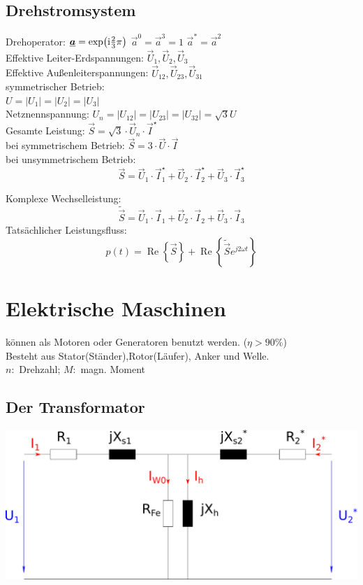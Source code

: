 \documentclass[fs, footer]{latex4ei}
\begin{document}
\begin{multicols}{4}
\begin{tabular}{ll}
		\end{tabular}



		\subsection{Drehstromsystem}
		Drehoperator: $\underline{\boldsymbol {a}} = \exp\bigl(\mathrm{i} \frac{2}{3} \pi \bigr)$ \qquad $\vec a^0 = \vec a^3 = 1$ \quad $\vec a^* = \vec a^2$\\
		
		
		Effektive Leiter-Erdspannungen: $\vec U_1,\vec U_2,\vec U_3$\\
		Effektive Außenleiterspannungen: $\vec U_{12},\vec U_{23},\vec U_{31}$\\
		symmetrischer Betrieb:\\
		$U = |U_1| = |U_2| = |U_3|$\\
		Netznennspannung: $U_n = |U_{12}| = |U_{23}| = |U_{32}| = \sqrt{3} U$\\
		Gesamte Leistung: $\vec S = \sqrt{3} \cdot \vec U_n \cdot \vec I^\star$\\
		bei symmetrischem Betrieb: $\vec S = 3 \cdot \vec U \cdot \vec I$\\
		bei unsymmetrischem Betrieb: 
		\[\vec S = \vec U_1 \cdot \vec I_1^\star + \vec U_2 \cdot \vec I_2^\star + \vec U_3 \cdot \vec I_3^\star\]
		
		Komplexe Wechselleistung:
		\[\tilde{\vec S} = \vec U_1 \cdot \vec I_1 + \vec U_2 \cdot \vec I_2 + \vec U_3 \cdot \vec I_3\]
		Tatsächlicher Leistungsfluss:
		\[p(t) = \operatorname{Re} \left\{ \vec S \right\} + \operatorname{Re} \left\{\tilde{\vec S} e^{j 2 \omega t} \right\}\]


	\section{Elektrische Maschinen}
	können als Motoren oder Generatoren benutzt werden. ($\eta > 90\%$)\\
	Besteht aus Stator(Ständer),Rotor(Läufer), Anker und Welle.\\
	$n:$ Drehzahl; $M:$ magn. Moment\\


		\subsection{Der Transformator}
		
		\includegraphics[scale=.2]{./img/ersatzschaltbild_transformator.pdf} \\


\end{multicols}
\end{document}
